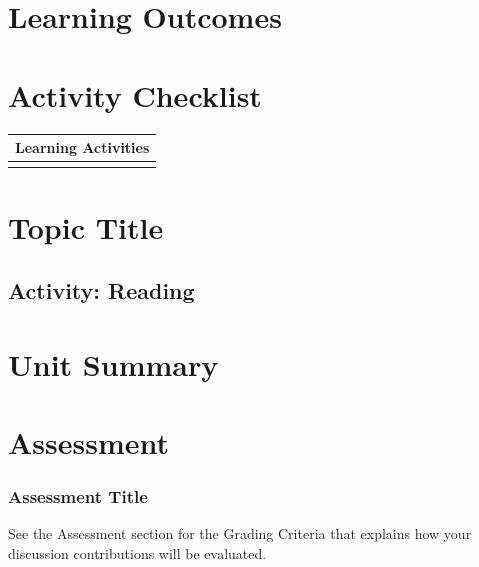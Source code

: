 \documentclass[
]{book}
\begin{document}
\hypertarget{learning-outcomes-2}{%
\section*{Learning Outcomes}\label{learning-outcomes-2}}

\hypertarget{activity-checklist-2}{%
\section*{Activity Checklist}\label{activity-checklist-2}}

\begin{longtable}[]{@{}l@{}}
\toprule()
Learning Activities \\
\midrule()
\endhead
 \\
\bottomrule()
\end{longtable}

\hypertarget{topic-title-2}{%
\section*{Topic Title}\label{topic-title-2}}

\hypertarget{activity-reading-1}{%
\subsection*{Activity: Reading}\label{activity-reading-1}}

\begin{reflect}

\end{reflect}

\hypertarget{unit-summary-1}{%
\section*{Unit Summary}\label{unit-summary-1}}

\hypertarget{assessment-2}{%
\section*{Assessment}\label{assessment-2}}

\begin{assessment}
\hypertarget{assessment-title}{%
\subsubsection*{Assessment Title}\label{assessment-title}}

See the Assessment section for the Grading Criteria that explains how
your discussion contributions will be evaluated.
\end{assessment}
\end{document}
